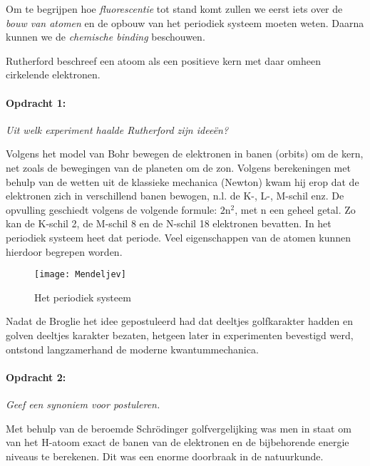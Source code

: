 Om te begrijpen hoe \emph{fluorescentie} tot stand komt zullen we
eerst iets over de \emph{bouw van atomen} en de opbouw van het periodiek
systeem moeten weten. Daarna kunnen we de \emph{chemische binding}
beschouwen.

Rutherford beschreef een atoom als een positieve kern met daar omheen
cirkelende elektronen.


\paragraph*{Opdracht 1:}

\emph{Uit welk experiment haalde Rutherford zijn ideeën?}

Volgens het model van Bohr bewegen de elektronen in banen (orbits)
om de kern, net zoals de bewegingen van de planeten om de zon. Volgens
berekeningen met behulp van de wetten uit de klassieke mechanica (Newton)
kwam hij erop dat de elektronen zich in verschillend banen bewogen,
n.l. de K-, L-, M-schil enz. De opvulling geschiedt volgens de volgende
formule: $2\mathrm{n}^{2}$, met n een geheel getal. Zo kan de K-schil
2, de M-schil 8 en de N-schil 18 elektronen bevatten. In het periodiek
systeem heet dat periode. Veel eigenschappen van de atomen kunnen
hierdoor begrepen worden.

\begin{figure}[h]
\noindent \begin{centering}
\texttt{[image: Mendeljev]}
\par\end{centering}

\caption{Het periodiek systeem}
\end{figure}


Nadat de Broglie het idee gepostuleerd had dat deeltjes golfkarakter
hadden en golven deeltjes karakter bezaten, hetgeen later in experimenten
bevestigd werd, ontstond langzamerhand de moderne kwantummechanica.


\paragraph*{Opdracht 2:}

\emph{Geef een synoniem voor postuleren.}

Met behulp van de beroemde Schrödinger golfvergelijking was men in
staat om van het H-atoom exact de banen van de elektronen en de bijbehorende
energie niveaus te berekenen. Dit was een enorme doorbraak in de natuurkunde.


